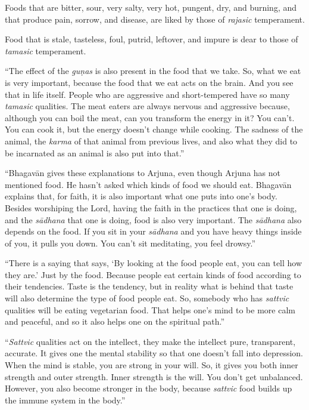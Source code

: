 {Foods that are bitter, sour, very salty, very hot, pungent, dry, and burning, and that produce pain, sorrow, and disease, are liked by those of \textit{rajasic} temperament.}

{Food that is stale, tasteless, foul, putrid, leftover, and impure is dear to those of \textit{tamasic} temperament.}

\enquote{The effect of the \textit{guṇas} is also present in the food that we take. So, what we eat is very important, because the food that we eat acts on the brain. And you see that in life itself. People who are aggressive and short-tempered have so many \textit{tamasic} qualities. The meat eaters are always nervous and aggressive because, although you can boil the meat, can you transform the energy in it? You can’t. You can cook it, but the energy doesn’t change while cooking. The sadness of the animal, the \textit{karma} of that animal from previous lives, and also what they did to be incarnated as an animal is also put into that.}

\enquote{Bhagavān gives these explanations to Arjuna, even though Arjuna has not mentioned food. He hasn’t asked which kinds of food we should eat. Bhagavān explains that, for faith, it is also important what one puts into one’s body. Besides worshiping the Lord, having the faith in the practices that one is doing, and the \textit{sādhana} that one is doing, food is also very important. The \textit{sādhana} also depends on the food. If you sit in your \textit{sādhana} and you have heavy things inside of you, it pulls you down. You can’t sit meditating, you feel drowsy.}

\enquote{There is a saying that says, \enquote{By looking at the food people eat, you can tell how they are.} Just by the food. Because people eat certain kinds of food according to their tendencies. Taste is the tendency, but in reality what is behind that taste will also determine the type of food people eat. So, somebody who has \textit{sattvic} qualities will be eating vegetarian food. That helps one’s mind to be more calm and peaceful, and so it also helps one on the spiritual path.}

\enquote{\textit{Sattvic} qualities act on the intellect, they make the intellect pure, transparent, accurate. It gives one the mental stability so that one doesn’t fall into depression. When the mind is stable, you are strong in your will. So, it gives you both inner strength and outer strength. Inner strength is the will. You don’t get unbalanced. However, you also become stronger in the body, because \textit{sattvic} food builds up the immune system in the body.}

